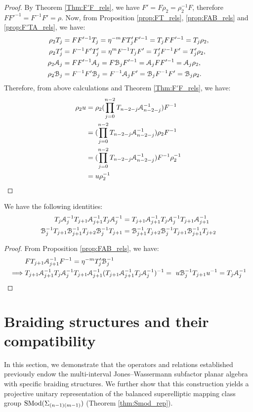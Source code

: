 \documentclass{amsart}
\begin{document}
\begin{proof}
By Theorem \ref{Thm:F'F_rels}, we have $F'=F\rho_2=\rho_2^{-1}F$, therefore $FF'^{-1}=F^{-1}F'=\rho$. Now, from Proposition \ref{prop:FT_rels}, \ref{prop:FAB_rels} and \ref{prop:F'TA_rels}, we have:
\[
\begin{aligned}
 \rho_2T_j&=FF'^{-1}T_j=\eta^{-m}FT'_jF'^{-1}=T_jFF'^{-1}=T_j\rho_2,\\
 \rho_2T'_j &=F^{-1}F'T'_j=\eta^{m}F^{-1}T_jF'=T'_jF^{-1}F'=T_j'\rho_2,\\     
 \rho_2\AA_j&=FF'^{-1}\AA_j=F\BB_jF'^{-1}=\AA_jFF'^{-1}=\AA_j\rho_2,\\
\rho_2\BB_j&=F^{-1}F'\BB_j=F^{-1}\AA_jF'=\BB_jF^{-1}F'=\BB_j\rho_2.
\end{aligned} 
\]
Therefore, from above calculations and Theorem \ref{Thm:F'F_rels}, we have:
\[
\begin{aligned}
\rho_2u&=\rho_2(\prod^{n-2}_{j=0} T_{n-2-j}\AA^{-1}_{n-2-j})F^{-1}\\
&=(\prod^{n-2}_{j=0} T_{n-2-j}\AA^{-1}_{n-2-j})\rho_2F^{-1}\\
&=(\prod^{n-2}_{j=0} T_{n-2-j}\AA^{-1}_{n-2-j})F^{-1}\rho^{-1}_2\\
&=u\rho_2^{-1}
\end{aligned}
\]
\end{proof}

\begin{Cor}\label{Cor:ABbraid_rels}
 We have the following identities:
 \[
 \begin{aligned} T_j\AA^{-1}_jT_{j+1}\AA^{-1}_{j+1}T_j\AA^{-1}_{j}&=T_{j+1}\AA^{-1}_{j+1}T_{j}\AA^{-1}_{j}T_{j+1}\AA^{-1}_{j+1} \\
\BB^{-1}_jT_{j+1}\BB^{-1}_{j+1}T_{j+2}\BB^{-1}_jT_{j+1}&=\BB^{-1}_{j+1}T_{j+2}\BB^{-1}_jT_{j+1}\BB^{-1}_{j+1}T_{j+2}  
 \end{aligned}
 \]
\end{Cor}
\begin{proof}
From Proposition \ref{prop:FAB_rels}, we have: 
\[
\begin{aligned}
&FT_{j+1}\AA^{-1}_{j+1}F^{-1}=\eta^{-m}T'_j\BB^{-1}_j\\
\implies &T_{j+1}\AA^{-1}_{j+1}T_{j}\AA^{-1}_{j}T_{j+1}\AA^{-1}_{j+1}(T_{j+1}\AA^{-1}_{j+1}T_{j}\AA^{-1}_{j})^{-1}=\ u\BB^{-1}_jT_{j+1}u^{-1}= T_j\AA^{-1}_{j}
\end{aligned}
\]
\end{proof}


\section{Braiding structures and their compatibility}
In this section, we demonstrate that the operators and relations established previously endow the multi-interval Jones–Wassermann subfactor planar algebra with specific braiding structures. We further show that this construction yields a projective unitary representation of the balanced superelliptic mapping class group $\SMod(\Sigma_{(n-1)(m-1)})$ (Theorem \ref{thm:Smod_rep}). 
\end{document}
